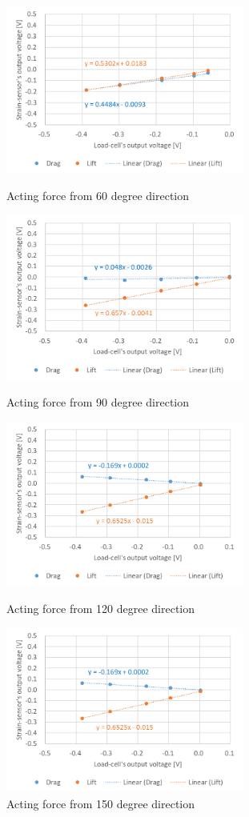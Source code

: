 \documentclass[twocolumn,a4j]{jsarticle}
\begin{document}
\begin{figure}[htbp]
    \footnotesize
    \begin{center}
        \includegraphics[width=78mm]{../images/60.png}
        \caption{Acting force from 60 degree direction}
        \includegraphics[width=78mm]{../images/90.png}
        \caption{Acting force from 90 degree direction}
        \includegraphics[width=78mm]{../images/120.png}
        \caption{Acting force from 120 degree direction}
        \includegraphics[width=78mm]{../images/150.png}
        \caption{Acting force from 150 degree direction}
    \end{center}
\end{figure}
\end{document}
